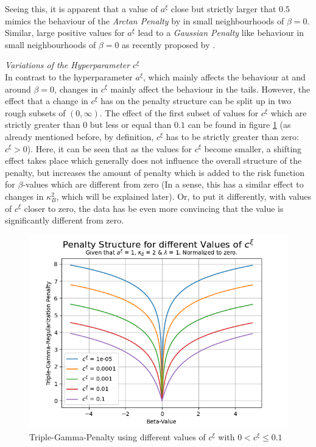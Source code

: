 \documentclass[12pt,a4paper]{article}
\begin{document}
Seeing this, it is apparent that a value of $a^\xi$ close but strictly larger that $0.5$ mimics the behaviour of the \textit{Arctan Penalty} by \textcite{WangZhu2016} in small neighbourhoods of $\beta=0$. Similar, large positive values for $a^\xi$ lead to a \textit{Gaussian Penalty} like behaviour in small neighbourhoods of $\beta = 0$ as recently proposed by \textcite{JohnVettamWu2022}.\\
\newpage

\textit{Variations of the Hyperparameter $c^\xi$}\\

In contrast to the hyperparameter $a^\xi$, which mainly affects the behaviour at and around $\beta=0$, changes in $c^\xi$ mainly affect the behaviour in the tails. However, the effect that a change in $c^\xi$ has on the penalty structure can be split up in two rough subsets of $(0,\infty)$. The effect of the first subset of values for $c^\xi$ which are strictly greater than $0$ but less or equal than $0.1$ can be found in figure \ref{fig:ChangeInC_SmallValues} (as already mentioned before, by definition, $c^\xi$ has to be strictly greater than zero: $c^\xi > 0$). Here, it can be seen that as the values for $c^\xi$ become smaller, a shifting effect takes place which generally does not influence the overall structure of the penalty, but increases the amount of penalty which is added to the risk function for $\beta$-values which are different from zero (In a sense, this has a similar effect to changes in $\kappa_B^2$, which will be explained later). Or, to put it differently, with values of $c^\xi$ closer to zero, the data has be even more convincing that the value is significantly different from zero.\\


\begin{figure}[!h]
\centering
\includegraphics[scale=0.75]{../02_simulation/021_simulation_figures/TGPenalty_ChangeInC_Part2.png}
\caption{Triple-Gamma-Penalty using different values of $c^\xi$ with $0 < c^\xi \leq 0.1$}
\label{fig:ChangeInC_SmallValues}
\end{figure}
\end{document}
